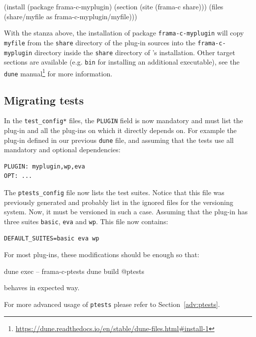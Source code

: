 \begin{dunecode}
(install
  (package frama-c-myplugin)
  (section (site (frama-c share)))
  (files (share/myfile as frama-c-myplugin/myfile)))
\end{dunecode}

With the stanza above, the installation of package \texttt{frama-c-myplugin}
will copy \texttt{myfile} from the \texttt{share} directory
of the plug-in sources into the \texttt{frama-c-myplugin} directory inside
the \texttt{share} directory of \framac's installation. Other target sections
are available (e.g. \texttt{bin} for installing an additional executable), see
the \texttt{dune}
manual\footnote{\url{https://dune.readthedocs.io/en/stable/dune-files.html\#install-1}}
for more information.

\subsection{Migrating tests}

In the \texttt{test\_config*} files, the \texttt{PLUGIN} field is now mandatory
and must list the plug-in and all the plug-ins on which it directly depends on.
For example the plug-in defined in our previous \texttt{dune} file, and assuming
that the tests use all mandatory and optional dependencies:

\begin{lstlisting}
PLUGIN: myplugin,wp,eva
OPT: ...
\end{lstlisting}

The \texttt{ptests\_config} file now lists the test suites. Notice that this file
was previously generated and probably list in the ignored files for the versioning
system. Now, it must be versioned in such a case. Assuming that the plug-in has
three suites \texttt{basic}, \texttt{eva} and \texttt{wp}. This file now
contains:

\begin{lstlisting}
DEFAULT_SUITES=basic eva wp
\end{lstlisting}

For most plug-ins, these modifications should be enough so that:
\begin{logs}
dune exec -- frama-c-ptests
dune build @ptests
\end{logs}
behaves in expected way.

For more advanced usage of \texttt{ptests} please refer to Section~\ref{adv:ptests}.


